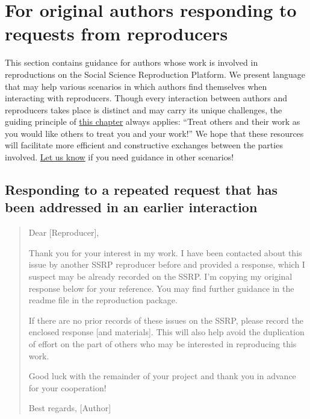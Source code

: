 \documentclass[
]{book}
\begin{document}
\hypertarget{for-original-authors-responding-to-requests-from-reproducers}{%
\section{For original authors responding to requests from reproducers}\label{for-original-authors-responding-to-requests-from-reproducers}}

This section contains guidance for authors whose work is involved in reproductions on the Social Science Reproduction Platform. We present language that may help various scenarios in which authors find themselves when interacting with reproducers. Though every interaction between authors and reproducers takes place is distinct and may carry its unique challenges, the guiding principle of \href{https://bitss.github.io/ACRE/guidance-for-a-constructive-exchange-between-reproducers-and-original-authors.html}{this chapter} always applies: ``Treat others and their work as you would like others to treat you and your work!'' We hope that these resources will facilitate more efficient and constructive exchanges between the parties involved. \href{emailto:acre@berkeley.edu}{Let us know} if you need guidance in other scenarios!

\hypertarget{responding-to-a-repeated-request-that-has-been-addressed-in-an-earlier-interaction}{%
\subsection{Responding to a repeated request that has been addressed in an earlier interaction}\label{responding-to-a-repeated-request-that-has-been-addressed-in-an-earlier-interaction}}

\begin{quote}
Dear {[}Reproducer{]},

Thank you for your interest in my work. I have been contacted about this issue by another SSRP reproducer before and provided a response, which I suspect may be already recorded on the SSRP. I'm copying my original response below for your reference. You may find further guidance in the readme file in the reproduction package.

If there are no prior records of these issues on the SSRP, please record the enclosed response {[}and materials{]}. This will also help avoid the duplication of effort on the part of others who may be interested in reproducing this work.

Good luck with the remainder of your project and thank you in advance for your cooperation!

Best regards,
{[}Author{]}
\end{quote}
\end{document}
